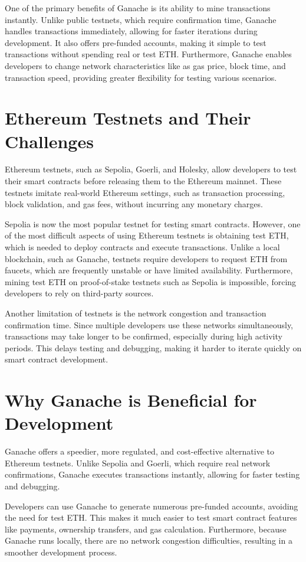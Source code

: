 \documentclass[a4paper,12pt]{report}
\begin{document}
One of the primary benefits of Ganache is its ability to mine transactions instantly.  Unlike public testnets, which require confirmation time, Ganache handles transactions immediately, allowing for faster iterations during development.  It also offers pre-funded accounts, making it simple to test transactions without spending real or test ETH.  Furthermore, Ganache enables developers to change network characteristics like as gas price, block time, and transaction speed, providing greater flexibility for testing various scenarios.

\section{Ethereum Testnets and Their Challenges}
Ethereum testnets, such as Sepolia, Goerli, and Holesky, allow developers to test their smart contracts before releasing them to the Ethereum mainnet.  These testnets imitate real-world Ethereum settings, such as transaction processing, block validation, and gas fees, without incurring any monetary charges.

 Sepolia is now the most popular testnet for testing smart contracts.  However, one of the most difficult aspects of using Ethereum testnets is obtaining test ETH, which is needed to deploy contracts and execute transactions.  Unlike a local blockchain, such as Ganache, testnets require developers to request ETH from faucets, which are frequently unstable or have limited availability.  Furthermore, mining test ETH on proof-of-stake testnets such as Sepolia is impossible, forcing developers to rely on third-party sources.


Another limitation of testnets is the network congestion and transaction confirmation time. Since multiple developers use these networks simultaneously, transactions may take longer to be confirmed, especially during high activity periods. This delays testing and debugging, making it harder to iterate quickly on smart contract development.

\section{Why Ganache is Beneficial for Development}
Ganache offers a speedier, more regulated, and cost-effective alternative to Ethereum testnets.  Unlike Sepolia and Goerli, which require real network confirmations, Ganache executes transactions instantly, allowing for faster testing and debugging.


Developers can use Ganache to generate numerous pre-funded accounts, avoiding the need for test ETH. This makes it much easier to test smart contract features like payments, ownership transfers, and gas calculation.  Furthermore, because Ganache runs locally, there are no network congestion difficulties, resulting in a smoother development process.
\end{document}
